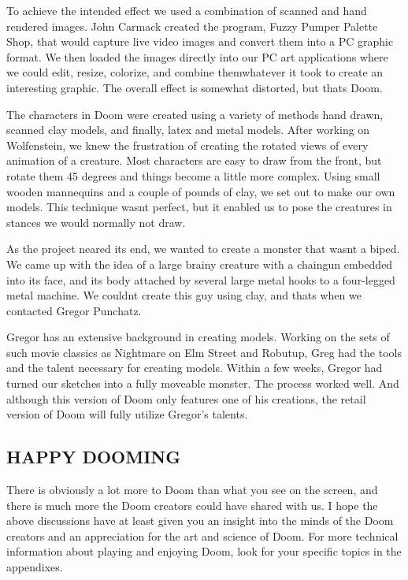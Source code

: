  To achieve the intended effect we used a combination of scanned and hand rendered images. John Carmack created the program, Fuzzy Pumper Palette Shop, that would capture live video images and convert them into a PC graphic format. We then loaded the images directly into our PC art applications where we could edit, resize, colorize, and combine themwhatever it took to create an interesting graphic. The overall effect is somewhat distorted, but thats Doom.\\ 
\par
 The characters in Doom were created using a variety of methods hand drawn, scanned clay models, and finally, latex and metal models. After working on Wolfenstein, we knew the frustration of creating the rotated views of every animation of a creature. Most characters are easy to draw from the front, but rotate them 45 degrees and things become a little more complex. Using small wooden mannequins and a couple of pounds of clay, we set out to make our own models. This technique wasnt perfect, but it enabled us to pose the creatures in stances we would normally not draw.\\
\par
As the project neared its end, we wanted to create a monster that wasnt a biped. We came up with the idea of a large brainy creature with a chaingun embedded into its face, and its body attached by several large metal hooks to a four-legged metal machine. We couldnt create this guy using clay, and thats when we contacted Gregor Punchatz.\\
\par
 Gregor has an extensive background in creating models. Working on the sets of such movie classics as Nightmare on Elm Street and Robutup, Greg had the tools and the talent necessary for creating models. Within a few weeks, Gregor had turned our sketches into a fully moveable monster. The process worked well. And although this version of Doom only features one of his creations, the retail version of Doom will fully utilize Gregor's talents.

\subsection{HAPPY DOOMING}

There is obviously a lot more to Doom than what you see on the screen, and there is much more the Doom creators could have shared with us. I hope the above discussions have at least given you an insight into the minds of the Doom creators and an appreciation for the art and science of Doom. For more technical information about playing and enjoying Doom, look for your specific topics in the appendixes.\\
\par
